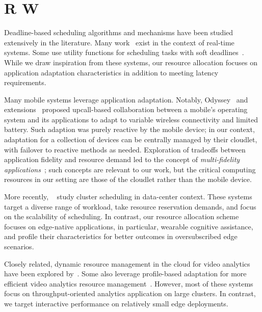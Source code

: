 \section{R W}
\label{sec: resource-management-related}

Deadline-based scheduling algorithms and mechanisms have been studied
extensively in the literature. Many work~\cite{tokuda1990real, kao1993deadline,
stankovic2012deadline, steiger2004operating} exist in the context of real-time
systems. Some use utility functions for scheduling tasks with soft
deadlines~\cite{ravindran2005recent, li2004utility}. While we draw
inspiration from these systems, our resource allocation focuses on application
adaptation characteristics in addition to meeting latency requirements.

Many mobile systems leverage application adaptation. Notably,
Odyssey~\cite{Noble1997} and extensions~\cite{Flinn1999} proposed upcall-based
collaboration between a mobile's operating system and its applications to adapt
to variable wireless connectivity and limited battery. Such adaption was purely
reactive by the mobile device; in our context, adaptation for a collection of
devices can be centrally managed by their cloudlet, with failover to reactive
methods as needed. Exploration of tradeoffs between application fidelity and
resource demand led to the concept of {\em multi-fidelity
applications}~\cite{Satya1999}; such concepts are relevant to our work, but the
critical computing resources in our setting are those of the cloudlet rather
than the mobile device.

More recently,
~\cite{boutin2014apollo,yao2014haste,verma2015large,ousterhout2013sparroW,delimitrou2014quasar,schwarzkopf2013omega}
study cluster scheduling in data-center context. These systems target a diverse
range of workload, take resource reservation demands, and focus on the
scalability of scheduling. In contrast, our resource allocation scheme focuses
on edge-native applications, in particular, wearable cognitive assistance, and
profile their characteristics for better outcomes in oversubscribed edge
scenarios.

Closely related, dynamic resource management in the cloud for video analytics
have been explored by~\cite{sembiring2013dynamic, fu2015drs, kaseb2015cloud}.
Some also leverage profile-based adaptation for more efficient video analytics
resource management~\cite{zhang2017live, hung2018videoedge, jiang2018chameleon}.
However, most of these systems focus on throughput-oriented analytics
application on large clusters. In contrast, we target interactive performance on
relatively small edge deployments.


